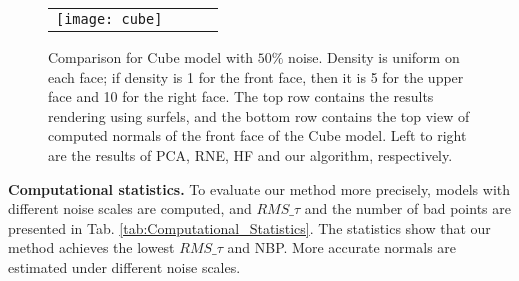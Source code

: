 \begin{figure}[htbp]
\begin{center}
    \begin{tabular}{c c c c}
        \texttt{[image: cube]}
    \end{tabular}
    \caption{Comparison for Cube model with $50\%$ noise. Density is uniform on each face; if density is 1 for the front face, then it is 5 for the upper face and 10 for the right face. The top row contains the results rendering using surfels, and the bottom row contains the top view of computed normals of the front face of the Cube model.  Left to right are the results of PCA, RNE, HF and our algorithm, respectively. \label{fig:cube_02_result}}
\end{center}
\end{figure}

\textbf{Computational statistics.}
To evaluate our method more precisely, models with different noise scales are computed, and $RMS\_\tau$ and the number of bad points are presented in Tab. \ref{tab:Computational_Statistics}. The statistics show that our method achieves the lowest $RMS\_\tau$ and NBP. More accurate normals are estimated under different noise scales.

